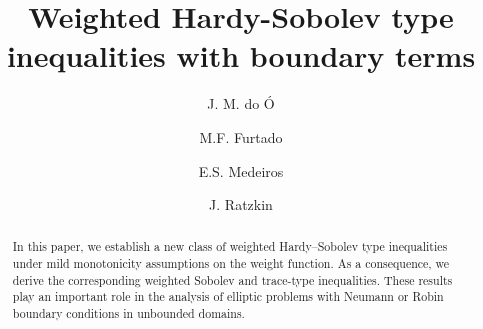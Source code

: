 \documentclass[12pt]{amsart}
\theoremstyle{definition}
\theoremstyle{plain}
\begin{document}
	
\title[Weighted Hardy-Sobolev type inequalities]{Weighted Hardy-Sobolev type 
inequalities with boundary terms
}
	
	\author[Do o]{J. M. do Ó}
	\address{Universidade Federal da Para\'iba, Departamento de Matem\'atica
 \newline{}-900 Jo\~{a}o Pessoa-PB, Brazil}
	
	\author[Furtado]{M.F. Furtado}
	\address{Universidade de Bras\'ilia, Departamento de Matem\'atica
 \newline{}-900 Bras\'ilia-DF, Brazil}
	
	
\author[Medeiros]{E.S. Medeiros}
\address{Universidade Federal da Para\'iba, Departamento de Matem\'atica
\newline{}-900 Jo\~{a}o Pessoa-PB, Brazil}

\author[J. Ratzkin]{J. Ratzkin}
\address[J. Ratzkin]{Department of Mathematics,
	Universit\"{a}t W\"{u}rzburg
	\newline{}, W\"{u}rzburg-BA, Germany}


	
		
	\begin{abstract}
		In this paper, we establish a new class of weighted Hardy–Sobolev type inequalities 
        under mild monotonicity assumptions on the weight function. As a consequence, we 
        derive the corresponding weighted Sobolev and trace-type inequalities. These 
        results play an important role in the analysis of elliptic problems with Neumann 
        or Robin boundary conditions in unbounded domains.
    \end{abstract}
	
	\maketitle
	
\end{document}

